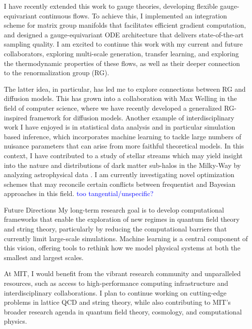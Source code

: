 \documentclass[11pt]{article}
\begin{document}
I have recently extended this work to gauge theories, developing flexible gauge-equivariant continuous flows. To achieve this, I implemented an integration scheme for matrix group manifolds that facilitates efficient gradient computation, and designed a gauge-equivariant ODE architecture that delivers state-of-the-art sampling quality.
I am excited to continue this work with my current and future collaborators, exploring multi-scale generation, transfer learning, and exploring the thermodynamic properties of these flows, as well as their deeper connection to the renormalization group (RG).

The latter idea, in particular, has led me to explore connections between RG and diffusion models. This has grown into a collaboration with Max Welling in the field of computer science, where we have recently developed a generalized RG-inspired framework for diffusion models.
Another example of interdisciplinary work I have enjoyed is in statistical data analysis and in particular simulation based inference, which incorporates machine learning to tackle large numbers of nuisance parameters that can arise from more faithful theoretical models.
In this context, I have contributed to a study of stellar streams which may yield insight into the nature and distributions of dark matter sub-halos in the Milky-Way by analyzing astrophysical data \cite{alvey2023AlbatrossScalable}.
I am currently investigating novel optimization schemes that may reconcile certain conflicts between frequentist and Bayesian approaches in this field. \textcolor{blue}{too tangential/unspecific?}



Future Directions
My long-term research goal is to develop computational frameworks that enable the exploration of new regimes in quantum field theory and string theory, particularly by reducing the computational barriers that currently limit large-scale simulations. Machine learning is a central component of this vision, offering tools to rethink how we model physical systems at both the smallest and largest scales.

At MIT, I would benefit from the vibrant research community and unparalleled resources, such as access to high-performance computing infrastructure and interdisciplinary collaborations. I plan to continue working on cutting-edge problems in lattice QCD and string theory, while also contributing to MIT's broader research agenda in quantum field theory, cosmology, and computational physics.
\end{document}
